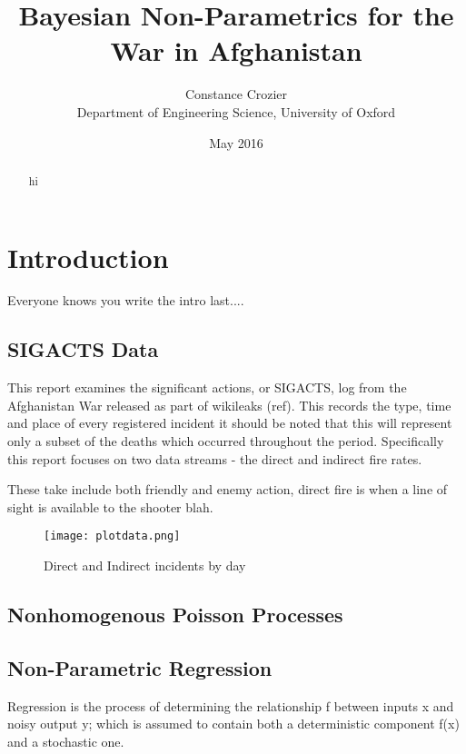 \documentclass[a4paper,11pt]{report}
\author{Constance Crozier\\Department of Engineering Science, University of Oxford}
\title{Bayesian Non-Parametrics for the War in Afghanistan}
\date{May 2016}
\begin{document}
\maketitle

\begin{abstract}
hi
\end{abstract}

\singlespacing
\pagestyle{plain}
\tableofcontents
\doublespacing

\pagebreak

\chapter{Introduction}
Everyone knows you write the intro last....



\section{SIGACTS Data}
This report examines the significant actions, or SIGACTS, log from the Afghanistan War released as part of wikileaks (ref). This records the type, time and place of every registered incident it should be noted that this will represent only a subset of the deaths which occurred throughout the period. Specifically this report focuses on two data streams - the direct and indirect fire rates. 

These take include both friendly and enemy action, direct fire is when a line of sight is available to the shooter blah.

\begin{figure}
\centering
\texttt{[image: plotdata.png]}
\caption{Direct and Indirect incidents by day}
\label{fig:sigactsdata}
\end{figure}

\section{Nonhomogenous Poisson Processes}



\section{Non-Parametric Regression}

Regression is the process of determining the relationship f between inputs x and noisy output y; which is assumed to contain both a deterministic component f(x) and a stochastic one.
\end{document}
